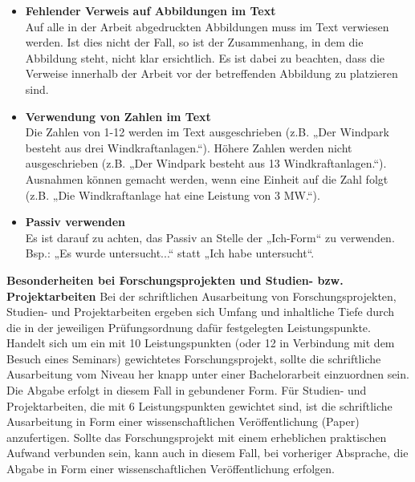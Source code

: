 \begin{itemize}
\item	\textbf{Fehlender Verweis auf Abbildungen im Text} \\
Auf alle in der Arbeit abgedruckten Abbildungen muss im Text verwiesen werden. Ist dies nicht der Fall, so ist der Zusammenhang, in dem die Abbildung steht, nicht klar ersichtlich. Es ist dabei zu beachten, dass die Verweise innerhalb der Arbeit vor der betreffenden Abbildung zu platzieren sind. 

\item	\textbf{Verwendung von Zahlen im Text} \\
Die Zahlen von 1-12 werden im Text ausgeschrieben (z.B. „Der Windpark besteht aus drei Windkraftanlagen.“). Höhere Zahlen werden nicht ausgeschrieben (z.B. „Der Windpark besteht aus 13 Windkraftanlagen.“). Ausnahmen können gemacht werden, wenn eine Einheit auf die Zahl folgt (z.B. „Die Windkraftanlage hat eine Leistung von 3 MW.“).

\item	\textbf{Passiv verwenden} \\
Es ist darauf zu achten, das Passiv an Stelle der „Ich-Form“ zu verwenden. Bsp.: „Es wurde untersucht...“ statt „Ich habe untersucht“.
\end{itemize}





\newpage
\textbf{Besonderheiten bei Forschungsprojekten und Studien- bzw. Projektarbeiten}
Bei der schriftlichen Ausarbeitung von Forschungsprojekten, Studien- und Projektarbeiten ergeben sich Umfang und inhaltliche Tiefe durch die in der jeweiligen Prüfungsordnung dafür festgelegten Leistungspunkte.
Handelt sich um ein mit 10 Leistungspunkten (oder 12 in Verbindung mit dem Besuch eines Seminars) gewichtetes Forschungsprojekt, sollte die schriftliche Ausarbeitung vom Niveau her knapp unter einer Bachelorarbeit einzuordnen sein. Die Abgabe erfolgt in diesem Fall in gebundener Form.
Für Studien- und Projektarbeiten, die mit 6 Leistungspunkten gewichtet sind, ist die schriftliche Ausarbeitung in Form einer wissenschaftlichen Veröffentlichung (Paper) anzufertigen. Sollte das Forschungsprojekt mit einem erheblichen praktischen Aufwand verbunden sein, kann auch in diesem Fall, bei vorheriger Absprache, die Abgabe in Form einer wissenschaftlichen Veröffentlichung erfolgen.




